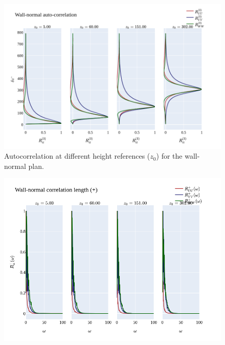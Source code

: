 \documentclass[]{article}
\theoremstyle{plain}
\theoremstyle{remark}
\begin{document}
\begin{figure}[H]
	\begin{center}
		\includegraphics[width=\textwidth]{../../output/figures/channel_wrles_retau395/split_time/Normal_plan/autocorrelation_z.png}
		\caption{Autocorrelation at different height references ($z_0$) for the wall-normal plan.}
	\end{center}
\end{figure}

\begin{figure}[H]
	\begin{center}
		\includegraphics[width=\textwidth]{../../output/figures/channel_wrles_retau395/split_time/Normal_plan/correlation_length_plus.png}
	\end{center}
\end{figure}
\end{document}
